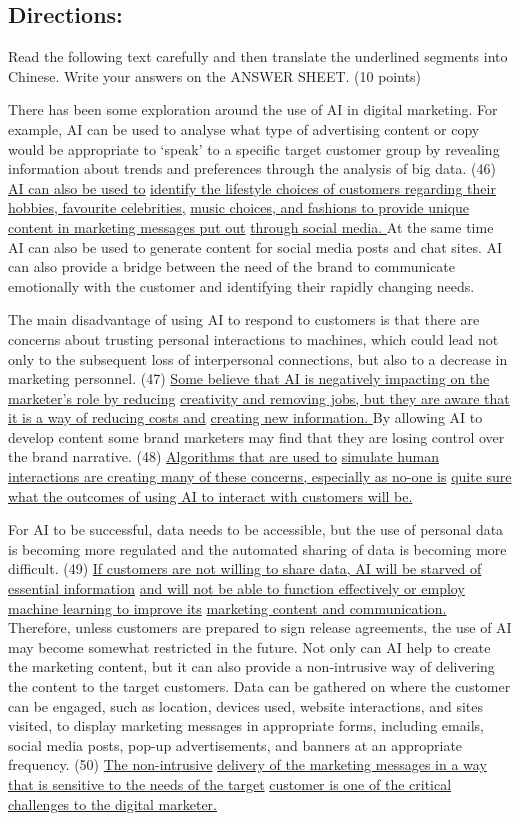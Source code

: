 \documentclass[UTF8,11pt]{ctexart}
\begin{document}
\subsection*{\textbf{Directions:}}


Read the following text carefully and then translate the underlined segments into Chinese. Write your answers on the ANSWER SHEET. (10 points)


There has been some exploration around the use of AI in digital marketing. For example, AI can be used to analyse what type of advertising content or copy would be appropriate to ‘speak’ to a specific target customer group by revealing information about trends and preferences through the analysis of big data. (46) \uline{AI can also be used to} \uline{identify the lifestyle choices of customers regarding their hobbies, favourite celebrities,} \uline{music choices, and fashions to provide unique content in marketing messages put out} \uline{through social media. }At the same time AI can also be used to generate content for social media posts and chat sites. AI can also provide a bridge between the need of the brand to communicate emotionally with the customer and identifying their rapidly changing needs.


The main disadvantage of using AI to respond to customers is that there are concerns about trusting personal interactions to machines, which could lead not only to the subsequent loss of interpersonal connections, but also to a decrease in marketing personnel. (47) \uline{Some believe that AI is negatively impacting on the marketer’s role by reducing} \uline{creativity and removing jobs, but they are aware that it is a way of reducing costs and} \uline{creating new information. }By allowing AI to develop content some brand marketers may find that they are losing control over the brand narrative. (48) \uline{Algorithms that are used to} \uline{simulate human interactions are creating many of these concerns, especially as no-one is} \uline{quite sure what the outcomes of using AI to interact with customers will be.}


For AI to be successful, data needs to be accessible, but the use of personal data is becoming more regulated and the automated sharing of data is becoming more difficult. (49) \uline{If customers are not willing to share data, AI will be starved of essential information} \uline{and will not be able to function effectively or employ machine learning to improve its} \uline{marketing content and communication. }Therefore, unless customers are prepared to sign release agreements, the use of AI may become somewhat restricted in the future. Not only can AI help to create the marketing content, but it can also provide a non-intrusive way of delivering the content to the target customers. Data can be gathered on where the customer can be engaged, such as location, devices used, website interactions, and sites visited, to display marketing messages in appropriate forms, including emails, social media posts, pop-up advertisements, and banners at an appropriate frequency. (50) \uline{The non-intrusive} \uline{delivery of the marketing messages in a way that is sensitive to the needs of the target} \uline{customer is one of the critical challenges to the digital marketer.}
\end{document}
